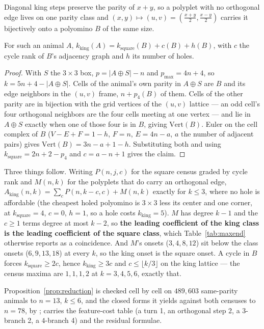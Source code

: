 \documentclass[11pt]{article}
\newcommand{\pmaxx}{p_{\max}}
\begin{document}
Diagonal king steps preserve the parity of $x+y$, so a polyplet with no
orthogonal edge lives on one parity class and
$(x,y) \mapsto (u,v) = (\tfrac{x+y}{2}, \tfrac{x-y}{2})$ carries it bijectively
onto a polyomino $B$ of the same size.

\begin{proposition}
\label{prop:reduction}
For such an animal $A$, $k_{\text{king}}(A) = k_{\text{square}}(B) + c(B) +
h(B)$, with $c$ the cycle rank of $B$'s adjacency graph and $h$ its number of
holes.
\end{proposition}

\begin{proof}
With $S$ the $3\times3$ box, $p = |A \oplus S| - n$ and $\pmaxx = 4n+4$, so
$k = 5n + 4 - |A \oplus S|$. Cells of the animal's own parity in $A \oplus S$
are $B$ and its edge neighbors in the $(u,v)$ frame, $n + p_4(B)$ of them.
Cells of the other parity are in bijection with the grid vertices of the $(u,v)$
lattice --- an odd cell's four orthogonal neighbors are the four cells meeting
at one vertex --- and lie in $A \oplus S$ exactly when one of those four is in
$B$, giving $\mathrm{Vert}(B)$. Euler on the cell complex of $B$ ($V - E + F =
1-h$, $F = n$, $E = 4n-a$, $a$ the number of adjacent pairs) gives
$\mathrm{Vert}(B) = 3n - a + 1 - h$. Substituting both and using
$k_{\text{square}} = 2n+2-p_4$ and $c = a-n+1$ gives the claim.
\end{proof}

Three things follow. Writing $P(n,j,c)$ for the square census graded by cycle
rank and $M(n,k)$ for the polyplets that do carry an orthogonal edge,
$A_{\text{king}}(n,k) = \sum_c P(n,k-c,c) + M(n,k)$ exactly for $k \le 3$, where
no hole is affordable (the cheapest holed polyomino is $3\times3$ less its
center and one corner, at $k_{\text{square}} = 4$, $c = 0$, $h = 1$, so a hole
costs $k_{\text{king}} = 5$). $M$ has degree $k-1$ and the $c \ge 1$ terms
degree at most $k-2$, so \textbf{the leading coefficient of the king class is
the leading coefficient of the square class}, which Table~\ref{tab:maxend}
otherwise reports as a coincidence. And $M$'s onsets ($3, 4, 8, 12$) sit below
the class onsets ($6, 9, 13, 18$) at every $k$, so the king onset is the square
onset. A cycle in $B$ forces $k_{\text{square}} \ge 2c$, hence
$k_{\text{king}} \ge 3c$ and $c \le \lfloor k/3 \rfloor$ on the king lattice ---
the census maxima are $1,1,1,2$ at $k = 3,4,5,6$, exactly that.

Proposition~\ref{prop:reduction} is checked cell by cell on $489{,}603$
same-parity animals to $n = 13$, $k \le 6$, and the closed forms it yields
against both censuses to $n = 78$, by
;
 carries the feature-cost table (a
turn 1, an orthogonal step 2, a $3$-branch 2, a $4$-branch 4) and the residual
formulae.
\end{document}
